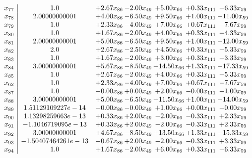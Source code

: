 \documentclass[8pt]{article}
\begin{document}
\[\begin{array}{c| c c@{\hskip 2pt} c@{\hskip 2pt} c@{\hskip 2pt} c@{\hskip 2pt} c@{\hskip 2pt} }
 x_{77}   &  1.0 & +  2.67 x_{86} & -2.00 x_{49} & +  5.00 x_{66} & +  0.33 x_{111} & -6.33 x_{59}\\
 x_{78}   &  2.00000000001 & +  4.00 x_{86} & -6.50 x_{49} & +  9.50 x_{66} & +  1.00 x_{111} & -11.00 x_{59}\\
 x_{79}   &  1.0 & +  2.33 x_{86} & -4.00 x_{49} & +  7.00 x_{66} & +  0.67 x_{111} & -7.67 x_{59}\\
 x_{80}   &  1.0 & +  1.67 x_{86} & -2.00 x_{49} & +  4.00 x_{66} & +  0.33 x_{111} & -4.33 x_{59}\\
 x_{81}   &  2.00000000001 & +  5.00 x_{86} & -6.50 x_{49} & +  9.50 x_{66} & +  1.00 x_{111} & -12.00 x_{59}\\
 x_{82}   &  2.0 & +  2.67 x_{86} & -2.50 x_{49} & +  4.50 x_{66} & +  0.33 x_{111} & -5.33 x_{59}\\
 x_{83}   &  1.0 & +  1.67 x_{86} & -2.00 x_{49} & +  3.00 x_{66} & +  0.33 x_{111} & -3.33 x_{59}\\
 x_{84}   &  3.00000000001 & +  5.67 x_{86} & -8.50 x_{49} & + 14.50 x_{66} & +  1.33 x_{111} & -17.33 x_{59}\\
 x_{85}   &  1.0 & +  2.67 x_{86} & -2.00 x_{49} & +  4.00 x_{66} & +  0.33 x_{111} & -5.33 x_{59}\\
 x_{62}   &  1.0 & +  2.33 x_{86} & -4.00 x_{49} & +  7.00 x_{66} & +  0.67 x_{111} & -7.67 x_{59}\\
 x_{87}   &  1.0 & -0.00 x_{86} & +  0.00 x_{49} & +  2.00 x_{66} & -0.00 x_{111} & -1.00 x_{59}\\
 x_{88}   &  3.00000000001 & +  5.00 x_{86} & -6.50 x_{49} & + 11.50 x_{66} & +  1.00 x_{111} & -14.00 x_{59}\\
 x_{89}   &  1.51129109227e-14 & -0.00 x_{86} & -0.00 x_{49} & +  1.00 x_{66} & +  0.00 x_{111} & -0.00 x_{59}\\
 x_{90}   &  1.13298259663e-13 & +  0.33 x_{86} & +  2.00 x_{49} & -2.00 x_{66} & -0.33 x_{111} & +  2.33 x_{59}\\
 x_{91}   &  -1.1046719095e-13 & +  0.33 x_{86} & +  2.00 x_{49} & -2.00 x_{66} & -0.33 x_{111} & +  2.33 x_{59}\\
 x_{92}   &  3.00000000001 & +  4.67 x_{86} & -8.50 x_{49} & + 13.50 x_{66} & +  1.33 x_{111} & -15.33 x_{59}\\
 x_{93}   &  -1.50407464261e-13 & -0.67 x_{86} & +  2.00 x_{49} & -2.00 x_{66} & -0.33 x_{111} & +  3.33 x_{59}\\
 x_{94}   &  1.0 & +  1.67 x_{86} & -2.00 x_{49} & +  6.00 x_{66} & +  0.33 x_{111} & -6.33 x_{59}\\

\end{array}\]
\end{document}
